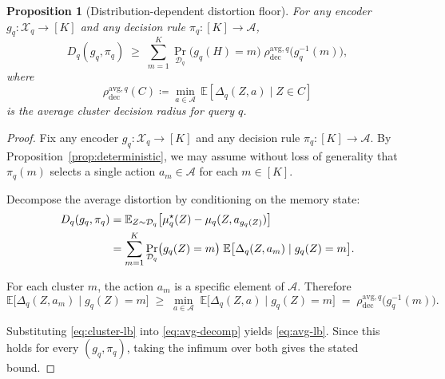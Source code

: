 \documentclass{article}
\theoremstyle{plain}
\newtheorem{proposition}{Proposition}
\theoremstyle{definition}
\theoremstyle{remark}
\newcommand{\cA}{\mathcal{A}}
\newcommand{\cX}{\mathcal{X}}
\newcommand{\cD}{\mathcal{D}}
\newcommand{\EE}{\mathbb{E}}
\begin{document}
\begin{proposition}[Distribution-dependent distortion floor]
\label{prop:avg-lb}
For any encoder \(g_q:\cX_q\to[K]\) and any decision rule
\(\pi_q:[K]\to\cA\),
\begin{equation}
\label{eq:avg-lb}
D_q(g_q,\pi_q)
\;\ge\;
\sum_{m=1}^{K}\Pr_{\cD_q}\!\bigl(g_q(H)=m\bigr)\;
\rho_{\mathrm{dec}}^{\mathrm{avg},q}\!\bigl(g_q^{-1}(m)\bigr),
\end{equation}
where
\[
\rho_{\mathrm{dec}}^{\mathrm{avg},q}(C)
\coloneqq
\min_{a\in\cA}\,\EE[\Delta_q(Z,a)\mid Z\in C]
\]
is the average cluster decision radius for query \(q\).
\end{proposition}

\begin{proof}
Fix any encoder \(g_q:\cX_q\to[K]\) and any decision rule
\(\pi_q:[K]\to\cA\). By Proposition~\ref{prop:deterministic}, we may assume
without loss of generality that \(\pi_q(m)\) selects a single action
\(a_m\in\cA\) for each \(m\in[K]\).

Decompose the average distortion by conditioning on the memory state:
\begin{align}
D_q(g_q,\pi_q)
&= \EE_{Z\sim\cD_q}
\bigl[\mu_q^\star(Z)-\mu_q(Z,a_{g_q(Z)})\bigr] \notag\\
&= \sum_{m=1}^{K}\Pr_{\cD_q}\bigl(g_q(Z)=m\bigr)\;
   \EE\bigl[\Delta_q(Z,a_m)\mid g_q(Z)=m\bigr].
   \label{eq:avg-decomp}
\end{align}

For each cluster \(m\), the action \(a_m\) is a specific element of \(\cA\).
Therefore
\begin{equation}
\label{eq:cluster-lb}
\EE\bigl[\Delta_q(Z,a_m)\mid g_q(Z)=m\bigr]
\;\ge\;
\min_{a\in\cA}\;\EE\bigl[\Delta_q(Z,a)\mid g_q(Z)=m\bigr]
\;=\;
\rho_{\mathrm{dec}}^{\mathrm{avg},q}\!\bigl(g_q^{-1}(m)\bigr).
\end{equation}

Substituting \eqref{eq:cluster-lb} into \eqref{eq:avg-decomp} yields
\eqref{eq:avg-lb}. Since this holds for every \((g_q,\pi_q)\), taking the
infimum over both gives the stated bound.
\end{proof}
\end{document}
